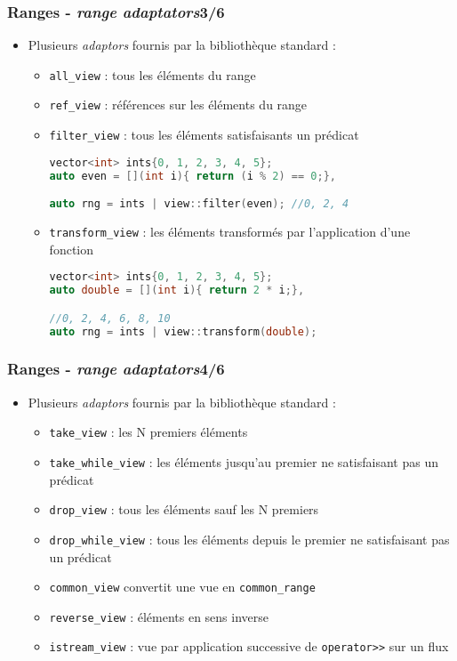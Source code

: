 \documentclass[C++.tex]{subfiles}
\begin{document}
\begin{frame}[fragile]
	\frametitle{Ranges - \textit{range adaptators}\titlehfill{}3/6}
	\begin{itemize}
		\item Plusieurs \textit{adaptors} fournis par la bibliothèque standard :


		\begin{itemize}
			\item \lstinline|all_view| : tous les éléments du range
			\item \lstinline|ref_view| : références sur les éléments du range
			\item \lstinline|filter_view| : tous les éléments satisfaisants un prédicat

			\begin{lstlisting}[language=C++]
vector<int> ints{0, 1, 2, 3, 4, 5};
auto even = [](int i){ return (i % 2) == 0;},

auto rng = ints | view::filter(even); //0, 2, 4\end{lstlisting}
 
			\item \lstinline|transform_view| : les éléments transformés par l'application d'une fonction 
			\begin{lstlisting}[language=C++]
vector<int> ints{0, 1, 2, 3, 4, 5};
auto double = [](int i){ return 2 * i;},

//0, 2, 4, 6, 8, 10
auto rng = ints | view::transform(double);\end{lstlisting}
		\end{itemize}
	\end{itemize}
\end{frame}

\begin{frame}[fragile]
	\frametitle{Ranges - \textit{range adaptators}\titlehfill{}4/6}
	\begin{itemize}
		\item Plusieurs \textit{adaptors} fournis par la bibliothèque standard :

		\begin{itemize}
			\item \lstinline|take_view| : les N premiers éléments
			\item \lstinline|take_while_view| : les éléments jusqu'au premier ne satisfaisant pas un prédicat
			\item \lstinline|drop_view| : tous les éléments sauf les N premiers
			\item \lstinline|drop_while_view| : tous les éléments depuis le premier ne satisfaisant pas un prédicat
			\item \lstinline|common_view| convertit une vue en \lstinline|common_range|
			\item \lstinline|reverse_view| : éléments en sens inverse
			\item \lstinline|istream_view| : vue par application successive de \lstinline|operator>>| sur un flux
		\end{itemize}
	\end{itemize}
\end{frame}
\end{document}
